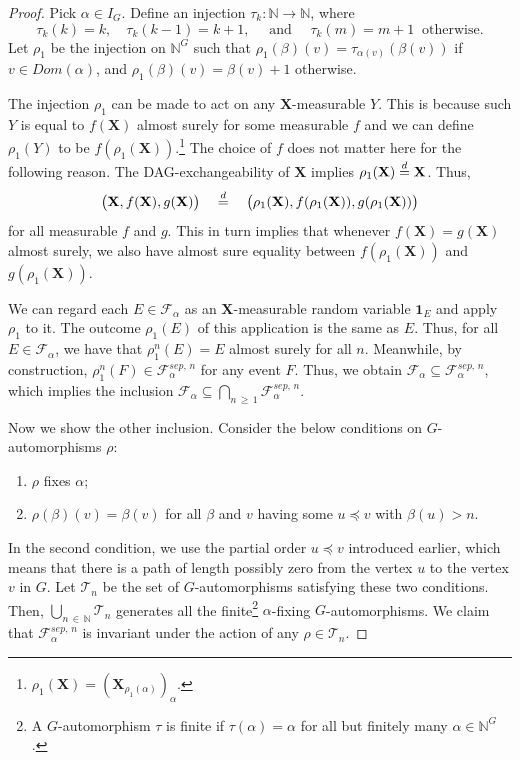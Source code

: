 \documentclass[10pt]{amsart}
\theoremstyle{definition}\newtheorem{defi}[theo]{Definition}\newtheorem{rema}[theo]{Remark}\newtheorem{exam}[theo]{Example}\newtheorem{exem}[theo]{Example}\newtheorem{nota}[theo]{Notation}
\newcommand{\alf}{\alpha}%
\newcommand*\bb{\beta}
\newcommand*{\sep}{\mathit{sep}}
\renewcommand{\d}{\buildrel{d}\over{=}}
\newcommand*\dom{\mathit{Dom}}
\newcommand*\N{\mathbb{N}}
\newcommand*\FF{\mathcal{F}}
\newcommand*\TT{\mathcal{T}}
\newcommand*\bX{\mathbf{X}}
\begin{document}
\begin{proof}
Pick $\alpha \in I_G$. Define an injection $\tau_k: \N \to \N$, where
\[
\tau_k(k)=k, \quad \tau_k(k-1)=k+1,\quad \text{ and }\quad \tau_k(m)=m+1 \ \text{ otherwise}.
\]
Let $\rho_1$ be the injection on $\N^G$ such that $\rho_1(\bb)(v)=\tau_{\alf(v)}(\bb(v))$ if $v \in \dom(\alf)$, and $\rho_1(\bb)(v)=\bb(v)+1$ otherwise.

The injection $\rho_1$ can be made to act on any $\bX$-measurable $Y$. This is because such $Y$ is equal to $f(\bX)$ almost surely for some measurable $f$ and we can define $\rho_1(Y)$ to be $f(\rho_1(\bX))$.\footnote{$\rho_1(\bX) = (\bX_{\rho_1(\alpha)})_\alpha$.} The choice of $f$ does not matter here for the following reason. The DAG-exchangeability of $\bX$ implies $\rho_1(\bX) \d \bX$. Thus,
\[
\big(\bX,f(\bX),g(\bX)\big)\quad\d \quad\big(\rho_1(\bX),f(\rho_1(\bX)),g(\rho_1(\bX))\big)
\]
for all measurable $f$ and $g$. This in turn implies that whenever $f(\bX) = g(\bX)$ almost surely, we also have almost sure equality between $f(\rho_1(\bX))$ and $g(\rho_1(\bX))$.

We can regard each $E \in \FF_\alf$ as an $\bX$-measurable random variable $\mathbf{1}_E$ and apply $\rho_1$ to it. The outcome $\rho_1(E)$ of this application is the same as $E$. Thus, for all $E \in \FF_\alf$, we have that $\rho^n_1(E) = E$ almost surely for all $n$. Meanwhile, by construction, $\rho_1^n (F) \in \mathcal{F}^{\sep,\,n}_\alf$ for any event $F$. Thus, we obtain $\FF_\alf \subseteq \mathcal{F}^{\sep,\,n}_\alf$, which implies the inclusion $\FF_\alf \subseteq \bigcap_{n\,\geq\,1} \mathcal{F}^{\sep,\,n}_\alf$.

Now we show the other inclusion. Consider the below conditions on $G$-automor\-phisms $\rho$:
\begin{enumerate}
\item $\rho$ fixes $\alf$;
\item $\rho(\bb)(v)=\bb(v)$ for all $\bb$ and $v$ having some $u \preceq v$ with $\bb(u)>n$.
\end{enumerate}
In the second condition, we use the partial order $u \preceq v$ introduced earlier, which means that there is a path of length possibly zero from the vertex $u$ to the vertex $v$ in $G$. Let $\TT_n$ be the set of $G$-automorphisms satisfying these two conditions. Then, $\bigcup_{n\,\in\,\N}\TT_n$ generates all the finite\footnote{A $G$-automorphism $\tau$ is finite if $\tau(\alf)=\alf$ for all but finitely many $\alf \in \N^G$.} $\alf$-fixing $G$-automorphisms. We claim that $\mathcal{F}^{\sep,\,n}_\alf$ is invariant under the action of any $\rho\in \TT_n$.


\end{proof}
\end{document}
